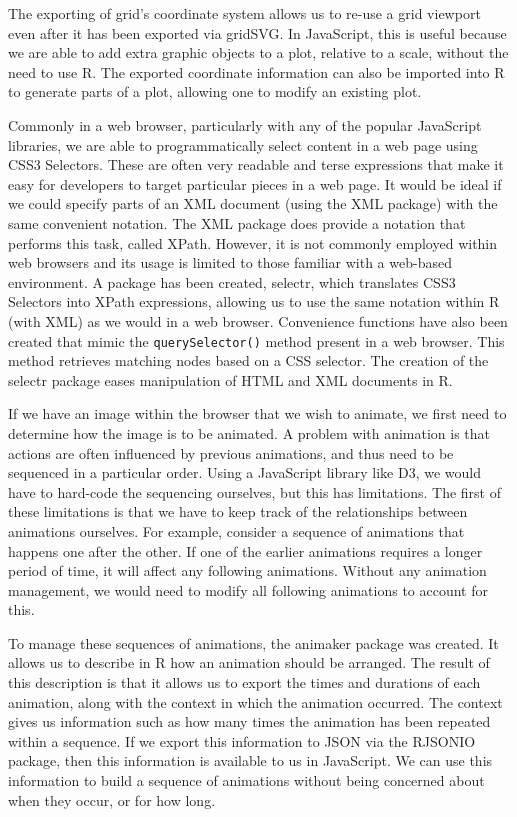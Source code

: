 \documentclass[11pt, a4paper]{article}
\newcommand{\grid}{\textsf{grid}}
\newcommand{\R}{\textsf{R}}
\newcommand{\gridSVG}{\textsf{gridSVG}}
\newcommand{\JS}{\textsf{JavaScript}}
\newcommand{\pkg}[1]{\textsf{#1}}
\newcommand{\code}[1]{\texttt{#1}}
\newcommand{\tsc}[1]{{\small \textsc{#1}}}
\begin{document}
The exporting of \grid{}'s coordinate system allows us to re-use a
\grid{} viewport even after it has been exported via \gridSVG{}. In
\JS{}, this is useful because we are able to add extra graphic objects
to a plot, relative to a scale, without the need to use \R{}. The
exported coordinate information can also be imported into \R{} to
generate parts of a plot, allowing one to modify an existing plot.

Commonly in a web browser, particularly with any of the popular \JS{}
libraries, we are able to programmatically select content in a web
page using CSS3 Selectors. These are often very readable and terse
expressions that make it easy for developers to target particular
pieces in a web page. It would be ideal if we could specify parts of
an \tsc{XML} document (using the \pkg{XML} package) with the same
convenient notation. The \pkg{XML} package does provide a notation
that performs this task, called XPath. However, it is not commonly
employed within web browsers and its usage is limited to those
familiar with a web-based environment. A package has been created,
\pkg{selectr}, which translates CSS3 Selectors into XPath expressions,
allowing us to use the same notation within \R{} (with \pkg{XML}) as
we would in a web browser. Convenience functions have also been
created that mimic the \code{querySelector()} method present in a web
browser. This method retrieves matching nodes based on a CSS
selector. The creation of the \pkg{selectr} package eases manipulation
of \tsc{HTML} and \tsc{XML} documents in \R{}.

If we have an image within the browser that we wish to animate, we
first need to determine how the image is to be animated. A problem
with animation is that actions are often influenced by previous
animations, and thus need to be sequenced in a particular order. Using
a \JS{} library like D3, we would have to hard-code the sequencing
ourselves, but this has limitations. The first of these limitations is
that we have to keep track of the relationships between animations
ourselves. For example, consider a sequence of animations that happens
one after the other. If one of the earlier animations requires a
longer period of time, it will affect any following
animations. Without any animation management, we would need to modify
all following animations to account for this.

To manage these sequences of animations, the \pkg{animaker} package
was created. It allows us to describe in \R{} how an animation should
be arranged. The result of this description is that it allows us to
export the times and durations of each animation, along with the
context in which the animation occurred. The context gives us
information such as how many times the animation has been repeated
within a sequence. If we export this information to \tsc{JSON} via the
\pkg{RJSONIO} package, then this information is available to us in
\JS{}. We can use this information to build a sequence of animations
without being concerned about when they occur, or for how long.
\end{document}
